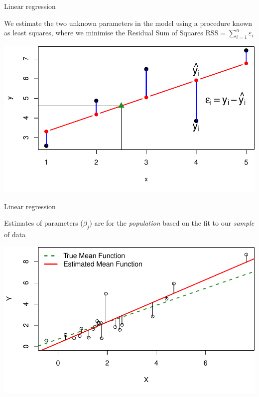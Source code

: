 \documentclass[10pt,ignorenonframetext,compress, aspectratio=169]{beamer}
\begin{document}
\begin{frame}{Linear regression}

We estimate the two unknown parameters in the model using a procedure
known as \alert{least squares}, where we minimise the
\alert{Residual Sum of Squares}
\(\mathrm{RSS} = \sum_{i=1}^n \varepsilon_i\)

\begin{center}\includegraphics[width=0.7\linewidth]{03-linear-models_files/figure-beamer/linear-reg-least-squares-1} \end{center}

\end{frame}

\begin{frame}{Linear regression}

Estimates of parameters (\(\beta_j\)) are for the \emph{population}
based on the fit to our \emph{sample} of data

\begin{center}\includegraphics[width=0.7\linewidth]{03-linear-models_files/figure-beamer/true-versus-estimate-line-1} \end{center}

\end{frame}
\end{document}

